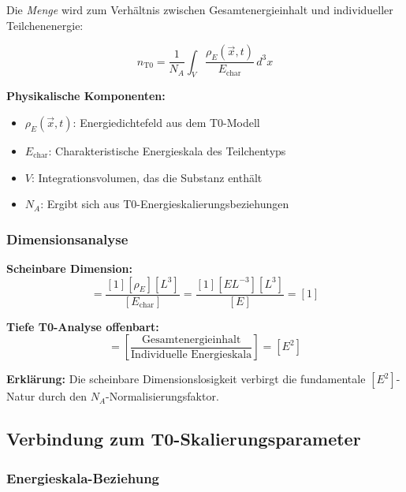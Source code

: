 \documentclass[12pt,a4paper]{article}
\newcommand{\rhoE}{\rho_E}
\newcommand{\Echar}{E_{\text{char}}}
\begin{document}
	Die \textit{Menge} wird zum Verhältnis zwischen Gesamtenergieinhalt und individueller Teilchenenergie:
	
	\begin{equation}
		\boxed{n_{\text{T0}} = \frac{1}{N_A} \int_V \frac{\rhoE(\vec{x},t)}{\Echar} \, d^3x}
		\label{eq:t0_mol_fundamental}
	\end{equation}
	
	\textbf{Physikalische Komponenten:}
	\begin{itemize}
		\item $\rhoE(\vec{x},t)$: Energiedichtefeld aus dem T0-Modell
		\item $\Echar$: Charakteristische Energieskala des Teilchentyps
		\item $V$: Integrationsvolumen, das die Substanz enthält
		\item $N_A$: Ergibt sich aus T0-Energieskalierungsbeziehungen
	\end{itemize}
	
	\subsubsection{Dimensionsanalyse}
	\label{subsubsec:mol_dimensionsanalyse}
	
	\textbf{Scheinbare Dimension:}
	\begin{equation}
		[n_{\text{T0}}] = \frac{[1][\rhoE][L^3]}{[\Echar]} = \frac{[1][E L^{-3}][L^3]}{[E]} = [1]
	\end{equation}
	
	\textbf{Tiefe T0-Analyse offenbart:}
	\begin{equation}
		[n_{\text{T0}}] = \left[\frac{\text{Gesamtenergieinhalt}}{\text{Individuelle Energieskala}}\right] = [E^2]
		\label{eq:mol_wahre_dimension}
	\end{equation}
	
	\textbf{Erklärung:} Die scheinbare Dimensionslosigkeit verbirgt die fundamentale $[E^2]$-Natur durch den $N_A$-Normalisierungsfaktor.
	
	\subsection{Verbindung zum T0-Skalierungsparameter}
	\label{subsec:mol_t0_skalierung}
	
	\subsubsection{Energieskala-Beziehung}
	\label{subsubsec:mol_energieskala}
	
\end{document}
